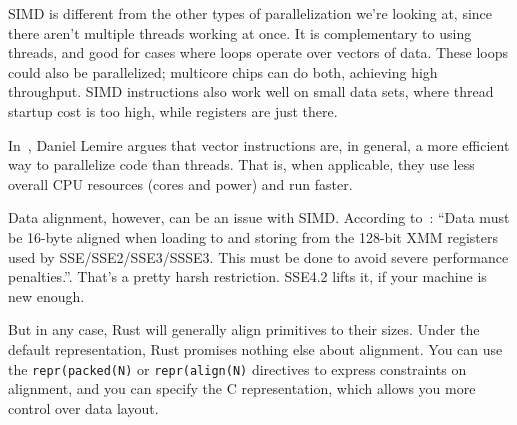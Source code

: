 \documentclass[a4paper]{report}
\begin{document}
SIMD is different from the other types of parallelization we're
looking at, since there aren't multiple threads working at once.
It is complementary to using threads, and good for cases
where loops operate over vectors of data. These loops could also be
parallelized; multicore chips can do both, achieving high throughput.
SIMD instructions also work well on small data sets, where thread startup
cost is too high, while registers are just there.

In~\cite{lemire18:_multic_simd}, Daniel Lemire argues that vector
instructions are, in general, a more efficient way to parallelize code
than threads. That is, when applicable, they use less overall CPU
resources (cores and power) and run faster.

Data alignment, however, can be an issue with SIMD. According to~\cite{sse}: ``Data must be 16-byte aligned when loading to and storing from the 128-bit XMM registers used by SSE/SSE2/SSE3/SSSE3. This must be done to avoid severe performance penalties.''. That's a pretty harsh restriction. SSE4.2 lifts it, if your machine is new enough.

But in any case, Rust will generally align primitives to their sizes. Under the default representation, Rust promises nothing else about alignment. You can use the \texttt{repr(packed(N)} or \texttt{repr(align(N)} directives to express constraints on alignment, and you can specify the C representation, which allows you more control over data layout.


\end{document}
